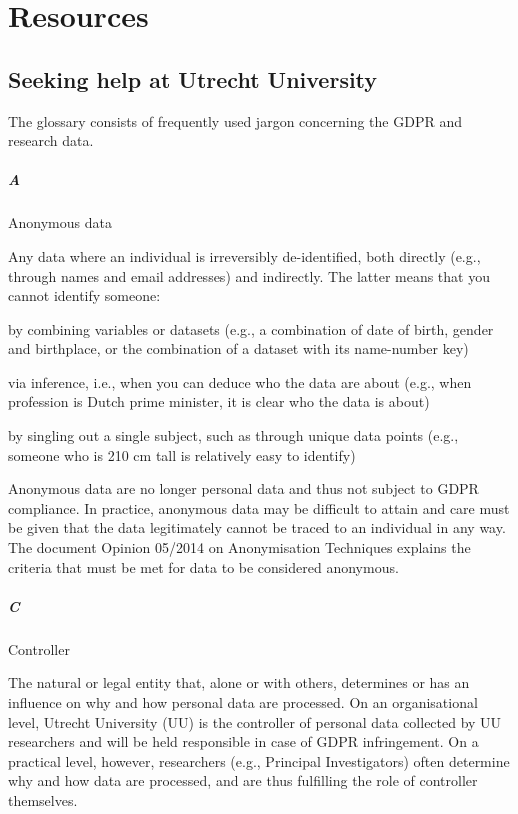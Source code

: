 \documentclass[
]{book}
\begin{document}
\hypertarget{part-resources}{%
\part*{Resources}\label{part-resources}}

\hypertarget{seeking-help}{%
\chapter{Seeking help at Utrecht University}\label{seeking-help}}

The glossary consists of frequently used jargon concerning the GDPR and research data.

\hypertarget{a}{%
\subsubsection{A}\label{a}}

Anonymous data

Any data where an individual is irreversibly de-identified, both directly (e.g., through names and email addresses) and indirectly. The latter means that you cannot identify someone:

by combining variables or datasets (e.g., a combination of date of birth, gender and birthplace, or the combination of a dataset with its name-number key)

via inference, i.e., when you can deduce who the data are about (e.g., when profession is Dutch prime minister, it is clear who the data is about)

by singling out a single subject, such as through unique data points (e.g., someone who is 210 cm tall is relatively easy to identify)

Anonymous data are no longer personal data and thus not subject to GDPR compliance. In practice, anonymous data may be difficult
to attain and care must be given that the data legitimately cannot be traced to an individual in any way. The document
Opinion 05/2014 on Anonymisation Techniques
explains the criteria that must be met for data to be considered anonymous.

\hypertarget{c}{%
\subsubsection{C}\label{c}}

Controller

The natural or legal entity that, alone or with others, determines or has an influence on why and how
personal data are processed. On an organisational level, Utrecht University (UU) is the controller of personal data
collected by UU researchers and will be held responsible in case of GDPR infringement. On a practical level, however,
researchers (e.g., Principal Investigators) often determine why and how data are processed, and are thus fulfilling the
role of controller themselves.
\end{document}

